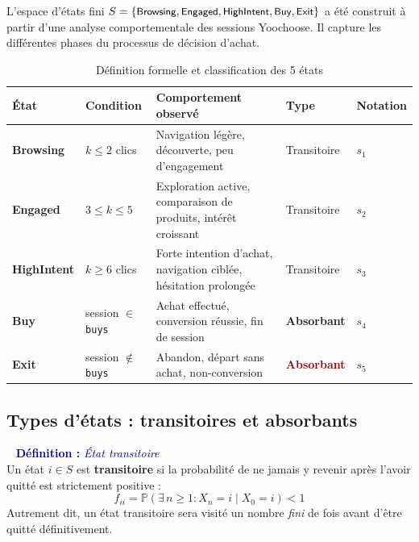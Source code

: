 \documentclass[11pt,a4paper]{article}
\newenvironment{defbox}[1]{%
  \vspace{3pt}\begin{framed}
  \noindent{\color{NavyBlue}\rule{0.3cm}{3pt}}~%
  \textcolor{DarkBlue}{\textbf{Définition :} \textit{#1}}\\[3pt]}
  {\end{framed}\vspace{3pt}}
\newcommand{\Prob}{\mathbb{P}}
\newcommand{\st}[1]{\textsf{\small#1}}
\begin{document}
L'espace d'états fini $S = \{\st{Browsing}, \st{Engaged}, \st{HighIntent},
\st{Buy}, \st{Exit}\}$ a été construit à partir d'une analyse
comportementale des sessions Yoochoose. Il capture les différentes
phases du processus de décision d'achat.

\begin{table}[H]
\centering
\caption{Définition formelle et classification des 5 états}
\label{tab:etats}
\begin{tabularx}{\textwidth}{>{\bfseries}lp{2.6cm}Xp{2.2cm}p{1.8cm}}
\toprule
\rowcolor{DarkBlue}
\color{white}État &
\color{white}Condition &
\color{white}Comportement observé &
\color{white}Type &
\color{white}Notation \\
\midrule
\rowcolor{LightBlue}
Browsing   & $k \leq 2$ clics &
  Navigation légère, découverte, peu d'engagement &
  Transitoire & $s_1$ \\
\rowcolor{LightGreen}
Engaged    & $3\!\leq\!k\!\leq\!5$ &
  Exploration active, comparaison de produits, intérêt croissant &
  Transitoire & $s_2$ \\
\rowcolor{LightOrange}
HighIntent & $k \geq 6$ clics &
  Forte intention d'achat, navigation ciblée, hésitation prolongée &
  Transitoire & $s_3$ \\
\rowcolor{LightBuy}
Buy        & session $\in$ \texttt{buys} &
  Achat effectué, conversion réussie, fin de session &
  \textcolor{BuyGreen}{\bfseries Absorbant} & $s_4$ \\
\rowcolor{LightRed}
Exit       & session $\notin$ \texttt{buys} &
  Abandon, départ sans achat, non-conversion &
  \textcolor{DarkRed}{\bfseries Absorbant} & $s_5$ \\
\bottomrule
\end{tabularx}
\end{table}

\subsection{Types d'états : transitoires et absorbants}

\begin{defbox}{État transitoire}
Un état $i \in S$ est \textbf{transitoire} si la probabilité de ne jamais
y revenir après l'avoir quitté est strictement positive :
\[
  f_{ii} = \Prob(\exists\,n \geq 1 : X_n = i \mid X_0 = i) < 1
\]
Autrement dit, un état transitoire sera visité un nombre \emph{fini}
de fois avant d'être quitté définitivement.
\end{defbox}
\end{document}

